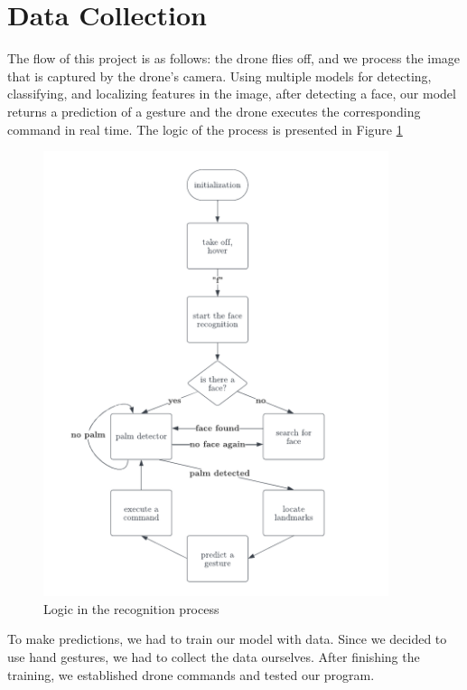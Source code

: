 \section{Data Collection}
The flow of this project is as follows: the drone flies off, and we process the image that is captured by the drone's camera. Using multiple models for detecting, classifying, and localizing features in the image, after detecting a face, our model returns a prediction of a gesture and the drone executes the corresponding command in real time. The logic of the process is presented in Figure \ref{fig:flowchart}


\begin{figure}
	\centering
	\includegraphics[width = 0.9\textwidth]{images/flowchart.pdf}
	\caption{Logic in the recognition process}
	\label{fig:flowchart}
\end{figure}


To make predictions, we had to train our model with data. Since we decided to use hand gestures, we had to collect the data ourselves. After finishing the training, we established drone commands and tested our program.


